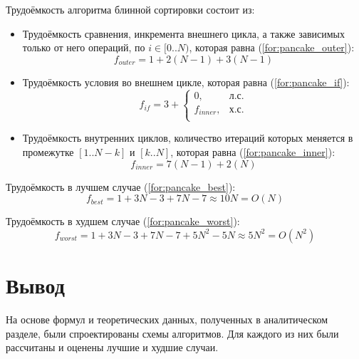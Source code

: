 Трудоёмкость алгоритма блинной сортировки состоит из:
\begin{itemize}
    \item Трудоёмкость сравнения, инкремента внешнего цикла, а также зависимых только от него операций, по $i \in [0..N)$, которая равна (\ref{for:pancake_outer}):
        \begin{equation}
            \label{for:pancake_outer}
            f_{outer} = 1 + 2(N - 1) + 3(N - 1)
        \end{equation}
    
    \item Трудоёмкость условия во внешнем цикле, которая равна (\ref{for:pancake_if}):
        \begin{equation}
            \label{for:pancake_if}
            f_{if} = 3 + \begin{cases}
                0, & \text{л.с.}\\
                f_{inner}, & \text{х.с.}\\
            \end{cases}
        \end{equation}
    \item Трудоёмкость внутренних циклов, количество итераций которых меняется в промежутке $[1..N-k]$ и $[k..N]$, которая равна (\ref{for:pancake_inner}):
        \begin{equation}
            \label{for:pancake_inner}
            f_{inner} = 7(N - 1) + 2(N)
        \end{equation}
\end{itemize}

Трудоёмкость в лучшем случае (\ref{for:pancake_best}):
\begin{equation}
    \label{for:pancake_best}
    f_{best} = 1 + 3N - 3 + 7N - 7 \approx 10N = O(N)
\end{equation}

Трудоёмкость в худшем случае (\ref{for:pancake_worst}):
\begin{equation}
    \label{for:pancake_worst}
    f_{worst} = 1 + 3N - 3 + 7N - 7 + 5N^2 - 5N \approx 5N^2 = O(N^2)
\end{equation}


\section*{Вывод}

На основе формул и теоретических данных, полученных в аналитическом разделе, были спроектированы схемы алгоритмов.
Для каждого из них были рассчитаны и оценены лучшие и худшие случаи.
